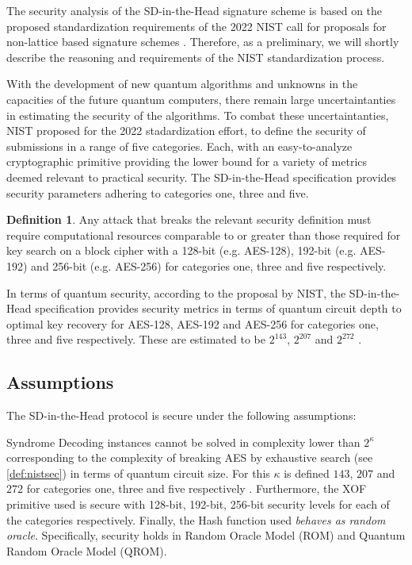 \documentclass[twoside,11pt,openright]{report}
\theoremstyle{definition}
\newtheorem{definition}{Definition}[section]
\theoremstyle{plain}
\begin{document}
The security analysis of the SD-in-the-Head signature scheme is based on the proposed standardization requirements of the 2022 NIST call for proposals for non-lattice based signature schemes \cite{nistcall}. Therefore, as a preliminary, we will shortly describe the reasoning and requirements of the NIST standardization process.

With the development of new quantum algorithms and unknowns in the capacities of the future quantum computers, there remain large uncertaintanties in estimating the security of the algorithms. To combat these uncertaintanties, NIST proposed for the 2022 stadardization effort, to define the security of submissions in a range of five categories. Each, with an easy-to-analyze cryptographic primitive providing the lower bound for a variety of metrics deemed relevant to practical security. The SD-in-the-Head specification provides security parameters adhering to categories one, three and five.

\begin{definition}
  \label{def:nistsec}
  Any attack that breaks the relevant security definition must require computational resources comparable to or greater than those required for key search on a block cipher with a 128-bit (e.g. AES-128), 192-bit (e.g. AES-192) and 256-bit (e.g. AES-256) for categories one, three and five respectively.
\end{definition}

In terms of quantum security, according to the proposal by NIST, the SD-in-the-Head specification provides security metrics in terms of quantum circuit depth to optimal key recovery for AES-128, AES-192 and AES-256 for categories one, three and five respectively. These are estimated to be $2^{143}$, $2^{207}$ and $2^{272}$ \cite{nistcall}.

\subsection{Assumptions}
\label{sec:assumptions}
The SD-in-the-Head protocol is secure under the following assumptions:

Syndrome Decoding instances cannot be solved in complexity lower than $2^\kappa$ corresponding to the complexity of breaking AES by exhaustive search (see \autoref{def:nistsec}) in terms of quantum circuit size. For this $\kappa$ is defined $143$, $207$ and $272$ for categories one, three and five respectively \cite{nistcall}. Furthermore, the XOF primitive used is secure with 128-bit, 192-bit, 256-bit security levels for each of the categories respectively. Finally, the Hash function used \textit{behaves as random oracle}. Specifically, security holds in Random Oracle Model (ROM) and Quantum Random Oracle Model (QROM).
\end{document}
